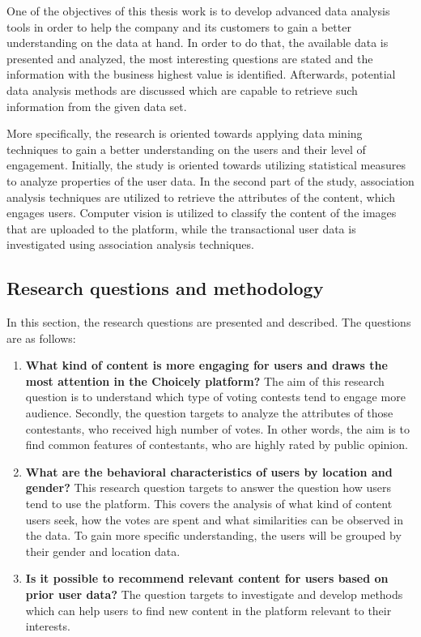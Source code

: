     One of the objectives of this thesis work is to develop advanced data analysis tools in order to help the company and its customers to gain a better understanding on the data at hand. In order to do that, the available data is presented and analyzed, the most interesting questions are stated and the information with the business highest value is identified. Afterwards, potential data analysis methods are discussed which are capable to retrieve such information from the given data set.  

    More specifically, the research is oriented towards applying data mining techniques to gain a better understanding on the users and their level of engagement. Initially, the study is oriented towards utilizing statistical measures to analyze properties of the user data. In the second part of the study, association analysis techniques are utilized to retrieve the attributes of the content, which engages users. Computer vision is utilized to classify the content of the images that are uploaded to the platform, while the transactional user data is investigated using association analysis techniques. %

\subsection{Research questions and methodology}
    In this section, the research questions are presented and described. The questions are as follows:

    \begin{enumerate}[label=RQ\arabic*:]
        \item \textbf{What kind of content is more engaging for users and draws the most attention in the Choicely platform?} The aim of this research question is to understand which type of voting contests tend to engage more audience. Secondly, the question targets to analyze the attributes of those contestants, who received high number of votes. In other words, the aim is to find common features of contestants, who are highly rated by public opinion.     
        \item \textbf{What are the behavioral characteristics of users by location and gender?} This research question targets to answer the question how users tend to use the platform. This covers the analysis of what kind of content users seek, how the votes are spent and what similarities can be observed in the data. To gain more specific understanding, the users will be grouped by their gender and location data.  
        \item \textbf{Is it possible to recommend relevant content for users based on prior user data?} The question targets to investigate and develop methods which can help users to find new content in the platform relevant to their interests.
    \end{enumerate}  

